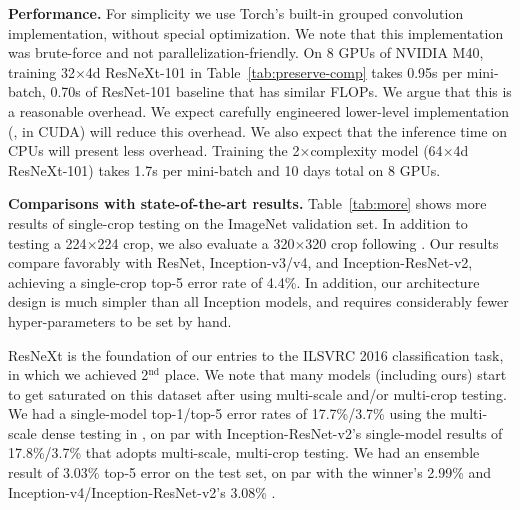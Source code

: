 \documentclass[10pt,twocolumn,letterpaper]{article}
\newcommand{\m}{$\times$}
\begin{document}
\vspace{.5em}
\noindent\textbf{Performance.}
For simplicity we use Torch's built-in grouped convolution implementation, without special optimization.
We note that this implementation was brute-force and not parallelization-friendly.
On 8 GPUs of NVIDIA M40, training 32\m4d ResNeXt-101 in Table~\ref{tab:preserve-comp} takes 0.95s per mini-batch, \vs 0.70s of ResNet-101 baseline that has similar FLOPs. We argue that this is a reasonable overhead. We expect carefully engineered lower-level implementation (\eg, in CUDA) will reduce this overhead. We also expect that the inference time on CPUs will present less overhead. Training the 2\m complexity model (64\m4d ResNeXt-101) takes 1.7s per mini-batch and 10 days total on 8 GPUs.

\vspace{.5em}
\noindent\textbf{Comparisons with state-of-the-art results.}
Table~\ref{tab:more} shows more results of single-crop testing on the ImageNet validation set. In addition to testing a 224$\times$224 crop, we also evaluate a 320$\times$320 crop following \cite{He2016a}. Our results compare favorably with ResNet, Inception-v3/v4, and Inception-ResNet-v2, achieving a single-crop top-5 error rate of 4.4\%. In addition, our architecture design is much simpler than all Inception models, and requires considerably fewer hyper-parameters to be set by hand.

ResNeXt is the foundation of our entries to the ILSVRC 2016 classification task, in which we achieved 2$^\text{nd}$ place. We note that many models (including ours) start to get saturated on this dataset after using multi-scale and/or multi-crop testing.
We had a single-model top-1/top-5 error rates of 17.7\%/3.7\% using the multi-scale dense testing in \cite{He2016}, on par with Inception-ResNet-v2's single-model results of 17.8\%/3.7\% that adopts multi-scale, multi-crop testing.
We had an ensemble result of 3.03\% top-5 error on the test set, on par with the winner's 2.99\% and Inception-v4/Inception-ResNet-v2's 3.08\% \cite{Szegedy2016}.
\end{document}
